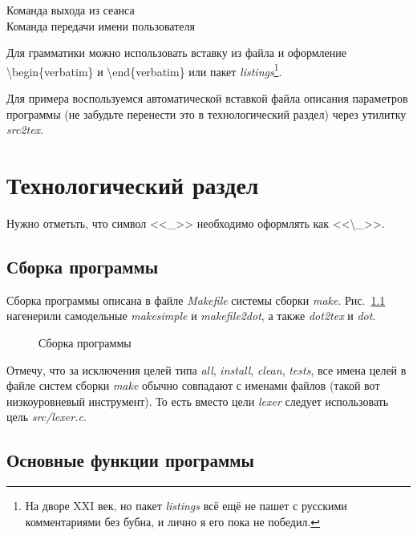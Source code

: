 \documentclass[a4paper,12pt]{report}
\begin{document}
\begin{description}
\item[Команда выхода из сеанса]
% 
\item[Команда передачи имени пользователя]
% 
\end{description}

Для грамматики можно использовать вставку из файла и оформление \textbackslash{}begin\{verbatim\} и \textbackslash{}end\{verbatim\} или пакет \textit{listings}\footnote{На дворе XXI век, но пакет \textit{listings} всё ещё не пашет с русскими комментариями без бубна, и лично я его пока не победил.}.

Для примера воспользуемся автоматической вставкой файла описания параметров программы (не забудьте перенести это в технологический раздел) через утилитку \textit{src2tex}.

% 
% 

\chapter{Технологический раздел}

Нужно отметьть, что символ <<\_>> необходимо оформлять как <<\textbackslash\_>>.

\section{Сборка программы}

Сборка программы описана в файле \textit{Makefile} системы сборки \textit{make}. Рис.~\ref{fig:make} нагенерили самодельные \textit{makesimple} и \textit{makefile2dot}, а также \textit{dot2tex} и \textit{dot}.

\begin{figure}
\centering
\caption{Сборка программы}
\label{fig:make}
\end{figure}

Отмечу, что за исключения целей типа \textit{all}, \textit{install}, \textit{clean}, \textit{tests}, все имена целей в файле систем сборки \textit{make} обычно совпадают с именами файлов (такой вот низкоуровневый инструмент). То есть вместо цели \textit{lexer} следует использовать цель \textit{src/lexer.c}.

\section{Основные функции программы}
\end{document}
